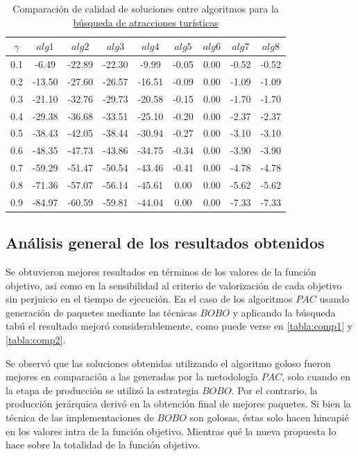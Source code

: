 \begin{table}[H]
\begin{center}
\begin{tabular}{|c|c|c|c|c|c|c|c|c|}
\hline
$\gamma$&$alg1$&$alg2$&$alg3$&$alg4$&$alg5$&$alg6$&$alg7$&$alg8$ \\ \hline
0.1 & -6.49 & -22.89 & -22.30 & -9.99 & -0.05 & 0.00 & -0.52 & -0.52 \\
0.2 & -13.50 & -27.60 & -26.57 & -16.51 & -0.09 & 0.00 & -1.09 & -1.09 \\
0.3 & -21.10 & -32.76 & -29.73 & -20.58 & -0.15 & 0.00 & -1.70 & -1.70 \\
0.4 & -29.38 & -36.68 & -33.51 & -25.10 & -0.20 & 0.00 & -2.37 & -2.37 \\
0.5 & -38.43 & -42.05 & -38.44 & -30.94 & -0.27 & 0.00 & -3.10 & -3.10 \\
0.6 & -48.35 & -47.73 & -43.86 & -34.75 & -0.34 & 0.00 & -3.90 & -3.90 \\
0.7 & -59.29 & -51.47 & -50.54 & -43.46 & -0.41 & 0.00 & -4.78 & -4.78 \\
0.8 & -71.36 & -57.07 & -56.14 & -45.61 & 0.00 & 0.00 & -5.62 & -5.62 \\
0.9 & -84.97 & -60.59 & -59.81 & -44.04 & 0.00 & 0.00 & -7.33 & -7.33 \\
\hline 
\end{tabular}
\caption{Comparación de calidad de soluciones entre algoritmos para la \hyperref[busqueda:atracciones]{búsqueda de atracciones turísticas}}
\label{tabla:comp4}
\end{center}
\end{table}

\subsection{Análisis general de los resultados obtenidos}
Se obtuvieron mejores resultados en términos de los valores de la función objetivo, así como en la sensibilidad al criterio de valorización de cada objetivo sin perjuicio en el tiempo de ejecución. En el caso de los algoritmos $PAC$ usando generación de paquetes mediante las técnicas $BOBO$ y aplicando la búsqueda tabú el resultado mejoró considerablemente, como puede verse en \autoref{tabla:comp1} y \autoref{tabla:comp2}.

Se observó que las soluciones obtenidas utilizando el algoritmo goloso fueron mejores en comparación a las generadas por la metodología $PAC$, solo cuando en la etapa de producción se utilizó la estrategia $BOBO$. Por el contrario, la producción jerárquica derivó en la obtención final de mejores paquetes. Si bien la técnica de las implementaciones de $BOBO$ son golosas, éstas solo hacen hincapié en los valores intra de la función objetivo. Mientras qué la nueva propuesta lo hace sobre la totalidad de la función objetivo. 

